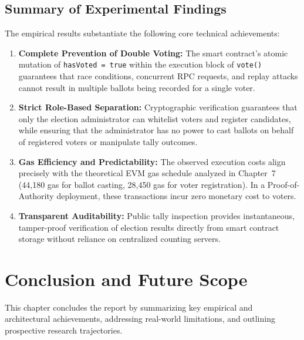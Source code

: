 \documentclass[12pt,a4paper]{report}
\begin{document}
\section{Summary of Experimental Findings}
The empirical results substantiate the following core technical achievements:
\begin{enumerate}
    \item \textbf{Complete Prevention of Double Voting:} The smart contract's atomic mutation of \texttt{hasVoted = true} within the execution block of \texttt{vote()} guarantees that race conditions, concurrent RPC requests, and replay attacks cannot result in multiple ballots being recorded for a single voter.
    \item \textbf{Strict Role-Based Separation:} Cryptographic verification guarantees that only the election administrator can whitelist voters and register candidates, while ensuring that the administrator has no power to cast ballots on behalf of registered voters or manipulate tally outcomes.
    \item \textbf{Gas Efficiency and Predictability:} The observed execution costs align precisely with the theoretical EVM gas schedule analyzed in Chapter~7 (44,180 gas for ballot casting, 28,450 gas for voter registration). In a Proof-of-Authority deployment, these transactions incur zero monetary cost to voters.
    \item \textbf{Transparent Auditability:} Public tally inspection provides instantaneous, tamper-proof verification of election results directly from smart contract storage without reliance on centralized counting servers.
\end{enumerate}

\fi

\chapter{Conclusion and Future Scope}

This chapter concludes the report by summarizing key empirical and architectural achievements, addressing real-world limitations, and outlining prospective research trajectories.
\end{document}
